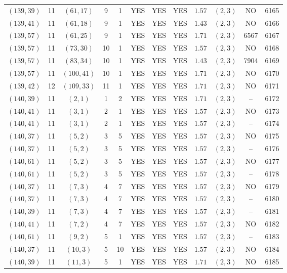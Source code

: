 \begin{longtable}{|c|c|c|c|c|c|c|c|c|c|c|c|}
$(139,39)$ & 11 & $(61,17)$ & 9 & 1 & YES & YES & YES & $1.57$ & $(2,3)$ & NO & 6165\\
$(139,41)$ & 11 & $(61,18)$ & 9 & 1 & YES & YES & YES & $1.43$ & $(2,3)$ & NO & 6166\\
$(139,57)$ & 11 & $(61,25)$ & 9 & 1 & YES & YES & YES & $1.71$ & $(2,3)$ & 6567 & 6167\\
$(139,57)$ & 11 & $(73,30)$ & 10 & 1 & YES & YES & YES & $1.57$ & $(2,3)$ & NO & 6168\\
$(139,57)$ & 11 & $(83,34)$ & 10 & 1 & YES & YES & YES & $1.43$ & $(2,3)$ & 7904 & 6169\\
$(139,57)$ & 11 & $(100,41)$ & 10 & 1 & YES & YES & YES & $1.71$ & $(2,3)$ & NO & 6170\\
$(139,42)$ & 12 & $(109,33)$ & 11 & 1 & YES & YES & YES & $1.71$ & $(2,3)$ & NO & 6171\\
$(140,39)$ & 11 & $(2,1)$ & 1 & 2 & YES & YES & YES & $1.71$ & $(2,3)$ & -- & 6172\\
$(140,41)$ & 11 & $(3,1)$ & 2 & 1 & YES & YES & YES & $1.57$ & $(2,3)$ & NO & 6173\\
$(140,41)$ & 11 & $(3,1)$ & 2 & 1 & YES & YES & YES & $1.57$ & $(2,3)$ & -- & 6174\\
$(140,37)$ & 11 & $(5,2)$ & 3 & 5 & YES & YES & YES & $1.57$ & $(2,3)$ & NO & 6175\\
$(140,37)$ & 11 & $(5,2)$ & 3 & 5 & YES & YES & YES & $1.57$ & $(2,3)$ & -- & 6176\\
$(140,61)$ & 11 & $(5,2)$ & 3 & 5 & YES & YES & YES & $1.57$ & $(2,3)$ & NO & 6177\\
$(140,61)$ & 11 & $(5,2)$ & 3 & 5 & YES & YES & YES & $1.57$ & $(2,3)$ & -- & 6178\\
$(140,37)$ & 11 & $(7,3)$ & 4 & 7 & YES & YES & YES & $1.57$ & $(2,3)$ & NO & 6179\\
$(140,37)$ & 11 & $(7,3)$ & 4 & 7 & YES & YES & YES & $1.57$ & $(2,3)$ & -- & 6180\\
$(140,39)$ & 11 & $(7,3)$ & 4 & 7 & YES & YES & YES & $1.57$ & $(2,3)$ & -- & 6181\\
$(140,41)$ & 11 & $(7,2)$ & 4 & 7 & YES & YES & YES & $1.57$ & $(2,3)$ & NO & 6182\\
$(140,61)$ & 11 & $(9,2)$ & 5 & 1 & YES & YES & YES & $1.57$ & $(2,3)$ & -- & 6183\\
$(140,37)$ & 11 & $(10,3)$ & 5 & 10 & YES & YES & YES & $1.57$ & $(2,3)$ & NO & 6184\\
$(140,39)$ & 11 & $(11,3)$ & 5 & 1 & YES & YES & YES & $1.71$ & $(2,3)$ & NO & 6185\\

\end{longtable}
